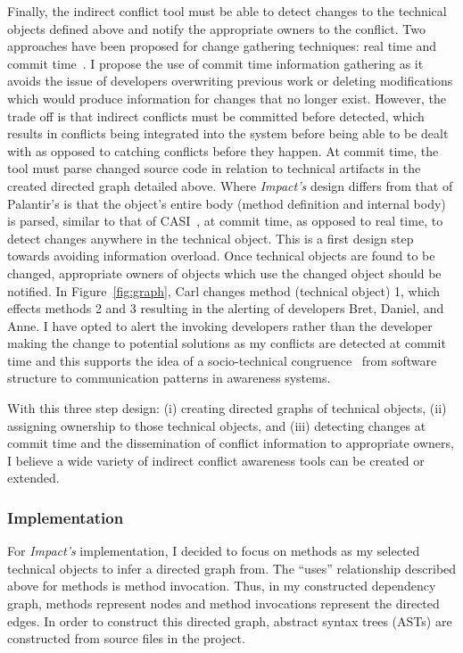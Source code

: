 Finally, the indirect conflict tool must be able to detect changes
to the technical objects defined above and notify the appropriate owners
to the conflict. 
Two approaches have been 
proposed for change gathering techniques: real time and commit 
time~\cite{Fitzpatrick:2002:SPA}.
I propose the use of commit time
information gathering as it avoids the issue of developers 
overwriting previous work or deleting modifications which would 
produce information for changes that no longer exist. However, the
trade off is that indirect conflicts must be committed before detected,
which results in conflicts being integrated into the system before being able
to be dealt with as opposed to catching conflicts before they happen.
At commit time, the tool must parse changed source code in relation
to technical artifacts in the created directed graph detailed above.
Where \textit{Impact's} design differs from that of Palantir's is that
the object's entire body (method definition and internal body) is 
parsed, similar to that of CASI~\cite{Servant:2010:CPI},
at commit time, as opposed to real time, to detect changes anywhere in the technical object.
This is a first design step towards avoiding information overload.
Once technical objects are found to be changed, appropriate owners
of objects which use the changed object should be notified. 
In Figure~\ref{fig:graph}, Carl changes method (technical object) 1,
which effects methods 2 and 3 resulting in the alerting of
developers Bret, Daniel, and Anne. I have opted to alert the invoking
developers rather than the developer making the change to potential
solutions as my conflicts are detected at commit time and this supports
the idea of a socio-technical congruence~\cite{Kwan:2011:ESC} 
from software structure to communication patterns in awareness systems.

With this three step design: (i) creating directed graphs of technical
objects, (ii) assigning ownership to those technical objects, and (iii)
detecting changes at commit time and the dissemination of conflict information
to appropriate owners, I believe a wide variety of
indirect conflict awareness tools can be created or extended.

\subsubsection{Implementation}
For \textit{Impact's} implementation, I decided to focus on methods as my
selected technical objects to infer a directed graph from. The ``uses'' 
relationship described above for methods is method invocation.
Thus, in my constructed dependency graph, methods represent nodes
and method invocations represent the directed edges. In order to 
construct this directed graph, abstract syntax trees (ASTs) are 
constructed from source files in the project.

